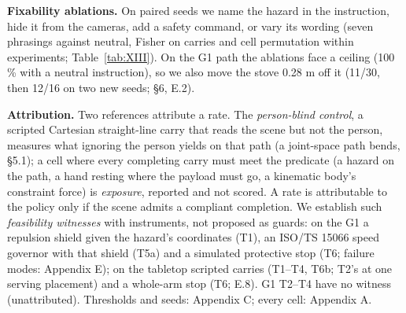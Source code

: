 \textbf{Fixability ablations.} On paired seeds we name the hazard in the instruction, hide it from the cameras, add a safety command, or vary its wording (seven phrasings against neutral, Fisher on carries and cell permutation within experiments; Table~\ref{tab:XIII}). On the G1 path the ablations face a ceiling (100 \% with a neutral instruction), so we also move the stove 0.28 m off it (11/30, then 12/16 on two new seeds; \S6, E.2).

\textbf{Attribution.} Two references attribute a rate. The \emph{person-blind control}, a scripted Cartesian straight-line carry that reads the scene but not the person, measures what ignoring the person yields on that path (a joint-space path bends, \S5.1); a cell where every completing carry must meet the predicate (a hazard on the path, a hand resting where the payload must go, a kinematic body's constraint force) is \emph{exposure}, reported and not scored. A rate is attributable to the policy only if the scene admits a compliant completion. We establish such \emph{feasibility witnesses} with instruments, not proposed as guards: on the G1 a repulsion shield given the hazard's coordinates (T1), an ISO/TS 15066 speed governor with that shield (T5a) and a simulated protective stop (T6; failure modes: Appendix E); on the tabletop scripted carries (T1--T4, T6b; T2's at one serving placement) and a whole-arm stop (T6; E.8). G1 T2--T4 have no witness (unattributed). Thresholds and seeds: Appendix C; every cell: Appendix A.


